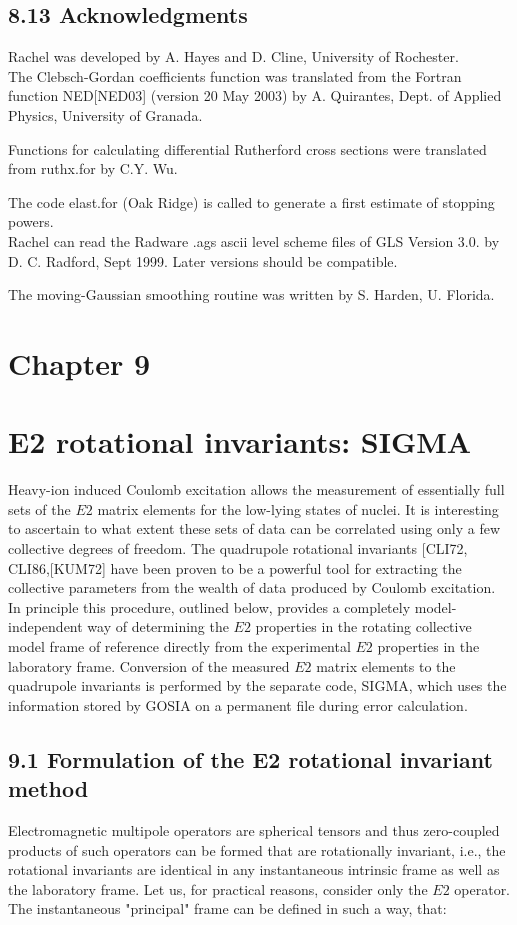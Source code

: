 \documentclass[10pt]{article}
\begin{document}
\subsection*{8.13 Acknowledgments}
Rachel was developed by A. Hayes and D. Cline, University of Rochester.\\[0pt]
The Clebsch-Gordan coefficients function was translated from the Fortran function NED[NED03] (version 20 May 2003) by A. Quirantes, Dept. of Applied Physics, University of Granada.

Functions for calculating differential Rutherford cross sections were translated from ruthx.for by C.Y. Wu.

The code elast.for (Oak Ridge) is called to generate a first estimate of stopping powers.\\
Rachel can read the Radware .ags ascii level scheme files of GLS Version 3.0. by D. C. Radford, Sept 1999. Later versions should be compatible.

The moving-Gaussian smoothing routine was written by S. Harden, U. Florida.

\section*{Chapter 9}
\section*{E2 rotational invariants: SIGMA }
Heavy-ion induced Coulomb excitation allows the measurement of essentially full sets of the $E 2$ matrix elements for the low-lying states of nuclei. It is interesting to ascertain to what extent these sets of data can be correlated using only a few collective degrees of freedom. The quadrupole rotational invariants [CLI72, CLI86,[KUM72] have been proven to be a powerful tool for extracting the collective parameters from the wealth of data produced by Coulomb excitation. In principle this procedure, outlined below, provides a completely model-independent way of determining the $E 2$ properties in the rotating collective model frame of reference directly from the experimental $E 2$ properties in the laboratory frame. Conversion of the measured $E 2$ matrix elements to the quadrupole invariants is performed by the separate code, SIGMA, which uses the information stored by GOSIA on a permanent file during error calculation.

\subsection*{9.1 Formulation of the E2 rotational invariant method}
Electromagnetic multipole operators are spherical tensors and thus zero-coupled products of such operators can be formed that are rotationally invariant, i.e., the rotational invariants are identical in any instantaneous intrinsic frame as well as the laboratory frame. Let us, for practical reasons, consider only the $E 2$ operator. The instantaneous "principal" frame can be defined in such a way, that:
\end{document}
